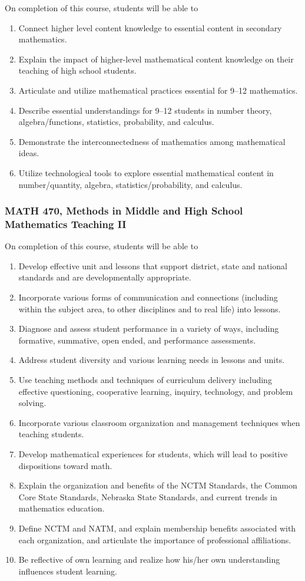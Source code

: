 \documentclass[10pt]{article}
\newenvironment{alphalist}{
\begin{enumerate}[label=(\arabic*),widest=107 ,leftmargin=25pt, itemsep=0pt]}
{\end{enumerate}}
\begin{document}
On  completion of this course, students will be able to
\begin{alphalist}

\item Connect higher level content knowledge to essential content in secondary mathematics.
\item Explain the impact of higher-level mathematical content knowledge on their teaching of high school students.
\item Articulate and utilize mathematical practices essential for 9--12 mathematics.
\item Describe essential understandings for 9--12 students in number theory, algebra/functions, statistics, probability, and calculus.
\item Demonstrate the interconnectedness of mathematics among mathematical ideas.
\item Utilize technological tools to explore essential mathematical content in number/quantity, algebra, statistics/probability, and calculus.
\end{alphalist}

\subsubsection*{MATH 470, Methods in Middle and High School Mathematics Teaching II}

On completion of this course, students will be able to
\begin{alphalist}
\item Develop effective unit and lessons that support district, state and national standards and are developmentally appropriate.
\item Incorporate various forms of communication and connections (including within the subject area, to other disciplines and to real life) into lessons.
\item Diagnose and assess student performance in a variety of ways, including formative, summative, open ended, and performance assessments.
\item Address student diversity and various learning needs in lessons and units.
\item Use teaching methods and techniques of curriculum delivery including effective questioning, cooperative learning, inquiry, technology, and problem solving.
\item Incorporate various classroom organization and management techniques when teaching students.
\item Develop mathematical experiences for students, which will lead to positive dispositions toward math.
 \item Explain the organization and benefits of the NCTM Standards, the Common Core State Standards, Nebraska State Standards, and current trends in mathematics education.
\item Define NCTM and NATM, and explain membership benefits associated with each organization, and articulate the importance of professional affiliations.
\item Be reflective of own learning and realize how his/her own understanding influences student learning.
\end{alphalist}
\end{document}
